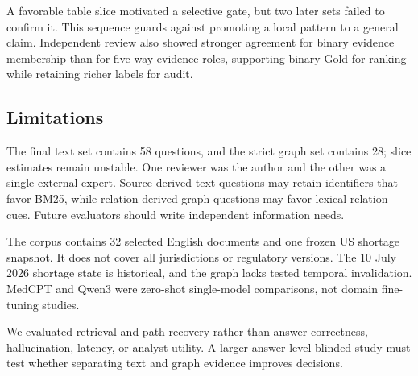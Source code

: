 A favorable table slice motivated a selective gate, but two later sets failed to confirm it. This sequence guards against promoting a local pattern to a general claim. Independent review also showed stronger agreement for binary evidence membership than for five-way evidence roles, supporting binary Gold for ranking while retaining richer labels for audit.

\subsection{Limitations}

The final text set contains 58 questions, and the strict graph set contains 28; slice estimates remain unstable. One reviewer was the author and the other was a single external expert. Source-derived text questions may retain identifiers that favor BM25, while relation-derived graph questions may favor lexical relation cues. Future evaluators should write independent information needs.

The corpus contains 32 selected English documents and one frozen US shortage snapshot. It does not cover all jurisdictions or regulatory versions. The 10 July 2026 shortage state is historical, and the graph lacks tested temporal invalidation. MedCPT and Qwen3 were zero-shot single-model comparisons, not domain fine-tuning studies.

We evaluated retrieval and path recovery rather than answer correctness, hallucination, latency, or analyst utility. A larger answer-level blinded study must test whether separating text and graph evidence improves decisions.

